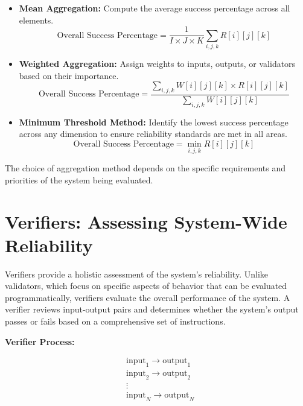 \documentclass{article}
\begin{document}
\begin{itemize}
    \item \textbf{Mean Aggregation:} Compute the average success percentage across all elements.
    \begin{equation*}
    \text{Overall Success Percentage} = \frac{1}{I \times J \times K} \sum_{i,j,k} R[i][j][k]
    \end{equation*}
    \item \textbf{Weighted Aggregation:} Assign weights to inputs, outputs, or validators based on their importance.
    \begin{equation*}
    \text{Overall Success Percentage} = \frac{\sum_{i,j,k} W[i][j][k] \times R[i][j][k]}{\sum_{i,j,k} W[i][j][k]}
    \end{equation*}
    \item \textbf{Minimum Threshold Method:} Identify the lowest success percentage across any dimension to ensure reliability standards are met in all areas.
    \begin{equation*}
    \text{Overall Success Percentage} = \min_{i,j,k} R[i][j][k]
    \end{equation*}
\end{itemize}

The choice of aggregation method depends on the specific requirements and priorities of the system being evaluated.

\pagebreak
\section{Verifiers: Assessing System-Wide Reliability}

Verifiers provide a holistic assessment of the system's reliability. Unlike validators, which focus on specific aspects of behavior that can be evaluated programmatically, verifiers evaluate the overall performance of the system. A verifier reviews input-output pairs and determines whether the system's output passes or fails based on a comprehensive set of instructions.

\textbf{Verifier Process:}

\begin{equation*}
\begin{aligned}
&\text{input}_1 \rightarrow \text{output}_1 \\
&\text{input}_2 \rightarrow \text{output}_2 \\
&\vdots \\
&\text{input}_N \rightarrow \text{output}_N
\end{aligned}
\end{equation*}
\end{document}

